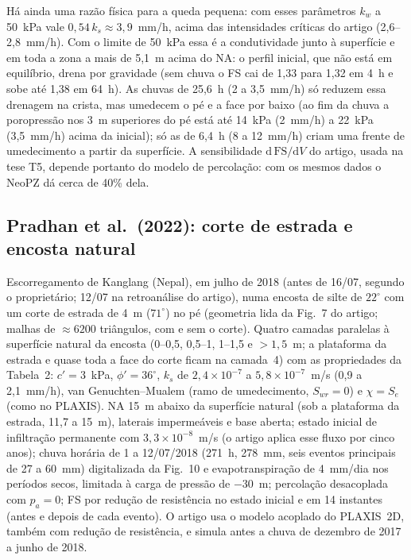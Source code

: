 H\'a ainda uma raz\~ao f\'isica para a queda pequena: com esses par\^ametros $k_w$ a 50~kPa vale $0{,}54\,k_s\approx
3{,}9$~mm/h, acima das intensidades cr\'iticas do artigo (2,6--2,8~mm/h). Com o limite de 50~kPa essa \'e a
condutividade junto \`a superf\'icie e em toda a zona a mais de 5,1~m acima do NA: o perfil inicial, que n\~ao est\'a em
equil\'ibrio, drena por gravidade (sem chuva o FS cai de 1,33 para 1,32 em 4~h e sobe at\'e 1,38 em 64~h). As chuvas
de 25,6~h (2 a 3,5~mm/h) s\'o reduzem essa drenagem na crista, mas umedecem o p\'e e a face por baixo (ao fim da chuva
a poropress\~ao nos 3~m superiores do p\'e est\'a at\'e 14~kPa (2~mm/h) a 22~kPa (3,5~mm/h) acima da inicial); s\'o as
de 6,4~h (8 a 12~mm/h) criam uma frente de umedecimento a partir da superf\'icie. A sensibilidade
$\mathrm{d}\,\mathrm{FS}/\mathrm{d}V$ do artigo, usada na tese T5, depende portanto do modelo de percola\c{c}\~ao: com
os mesmos dados o NeoPZ d\'a cerca de 40\% dela.

\subsection{Pradhan et al.\ (2022): corte de estrada e encosta natural}

Escorregamento de Kanglang (Nepal), em julho de 2018 (antes de 16/07, segundo o propriet\'ario; 12/07 na
retroan\'alise do artigo), numa encosta de silte de $22^\circ$ com um corte de estrada de 4~m ($71^\circ$) no p\'e
(geometria lida da Fig.~7 do artigo; malhas de $\approx6200$ tri\^angulos, com e sem o corte). Quatro camadas paralelas
\`a superf\'icie natural da encosta (0--0,5, 0,5--1, 1--1,5 e $>1{,}5$~m; a plataforma da estrada e quase toda a face
do corte ficam na camada~4) com as propriedades da Tabela~2: $c'=3$~kPa, $\phi'=36^\circ$, $k_s$ de
$2{,}4\times10^{-7}$ a $5{,}8\times10^{-7}$~m/s (0,9 a 2,1~mm/h), van Genuchten--Mualem (ramo de umedecimento,
$S_{wr}=0$) e $\chi=S_e$ (como no PLAXIS). NA 15~m abaixo da superf\'icie natural (sob a plataforma da estrada, 11,7 a
15~m), laterais imperme\'aveis e base aberta; estado inicial de infiltra\c{c}\~ao permanente com
$3{,}3\times10^{-8}$~m/s (o artigo aplica esse fluxo por cinco anos); chuva hor\'aria de 1 a 12/07/2018 (271~h,
278~mm, seis eventos principais de 27 a 60~mm) digitalizada da Fig.~10 e evapotranspira\c{c}\~ao de 4~mm/dia nos
per\'iodos secos, limitada \`a carga de press\~ao de $-30$~m; percola\c{c}\~ao desacoplada com $p_a=0$; FS por
redu\c{c}\~ao de resist\^encia no estado inicial e em 14 instantes (antes e depois de cada evento). O artigo usa o
modelo acoplado do PLAXIS~2D, tamb\'em com redu\c{c}\~ao de resist\^encia, e simula antes a chuva de dezembro de 2017 a
junho de 2018.

